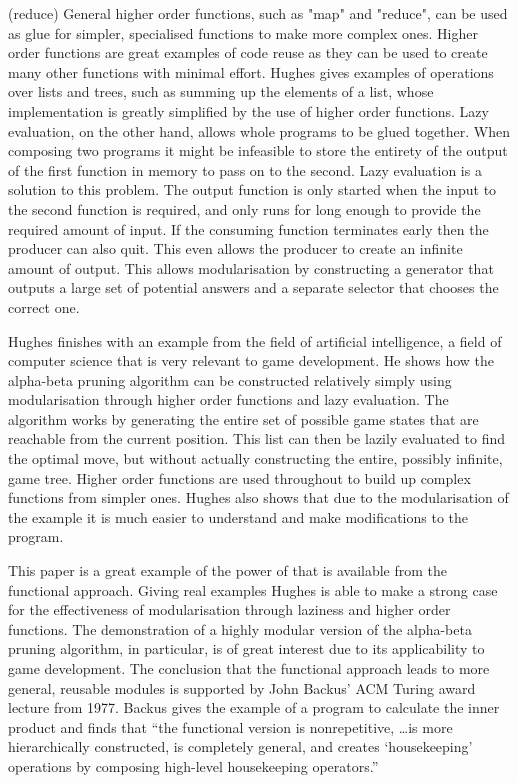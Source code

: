 \functions(reduce)
General higher order functions, such as "map" and "reduce", can be used as glue for
simpler, specialised functions to make more complex ones. Higher order functions
are great examples of code reuse as they can be used to create many other functions
with minimal effort. Hughes gives examples of operations over lists and trees, such
as summing up the elements of a list, whose implementation is greatly simplified
by the use of higher order functions. Lazy evaluation, on the other hand, allows
whole programs to be glued together. When composing two programs it might be
infeasible to store the entirety of the output of the first function in memory to
pass on to the second. Lazy evaluation is a solution to this problem. The output
function is only started when the input to the second function is required, and
only runs for long enough to provide the required amount of input. If the consuming
function terminates early then the producer can also quit. This even allows the
producer to create an infinite amount of output. This allows modularisation by
constructing a generator that outputs a large set of potential answers and a
separate selector that chooses the correct one.

Hughes finishes with an example from the field of artificial intelligence, a
field of computer science that is very relevant to game development. He shows
how the alpha-beta pruning algorithm can be constructed relatively simply using
modularisation through higher order functions and lazy evaluation. The algorithm
works by generating the entire set of possible game states that are reachable
from the current position. This list can then be lazily evaluated to find the
optimal move, but without actually constructing the entire, possibly infinite,
game tree. Higher order functions are used throughout to build up complex
functions from simpler ones. Hughes also shows that due to the modularisation
of the example it is much easier to understand and make modifications to the
program.

This paper is a great example of the power of that is available from the functional
approach. Giving real examples Hughes is able to make a strong case for the
effectiveness of modularisation through laziness and higher order functions.
The demonstration of a highly modular version of the alpha-beta pruning algorithm,
in particular, is of great interest due to its applicability to game development.
The conclusion that the functional approach leads to more general, reusable
modules is supported by John Backus' ACM Turing award lecture from 1977. Backus
gives the example of a program to calculate the inner product and finds that
``the functional version is nonrepetitive, \ldots is more hierarchically constructed,
is completely general, and creates `housekeeping' operations by composing high-level
housekeeping operators.''\cite[-2em]{backus1978liberate}

